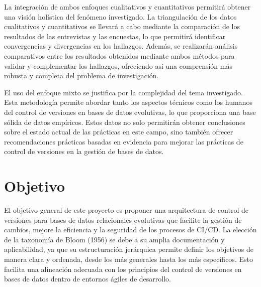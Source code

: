 \documentclass{IEEEtran}
\begin{document}
La integración de ambos enfoques cualitativos y cuantitativos permitirá obtener una visión holística del fenómeno investigado. La triangulación de los datos cualitativos y cuantitativos se llevará a cabo mediante la comparación de los resultados de las entrevistas y las encuestas, lo que permitirá identificar convergencias y divergencias en los hallazgos. Además, se realizarán análisis comparativos entre los resultados obtenidos mediante ambos métodos para validar y complementar los hallazgos, ofreciendo así una comprensión más robusta y completa del problema de investigación.

El uso del enfoque mixto se justifica por la complejidad del tema investigado. Esta metodología permite abordar tanto los aspectos técnicos como los humanos del control de versiones en bases de datos evolutivas, lo que proporciona una base sólida de datos empíricos. Estos datos no solo permitirán obtener conclusiones sobre el estado actual de las prácticas en este campo, sino también ofrecer recomendaciones prácticas basadas en evidencia para mejorar las prácticas de control de versiones en la gestión de bases de datos.


\section{Objetivo}
El objetivo general de este proyecto es proponer una arquitectura de control de versiones para bases de datos relacionales evolutivas que facilite la gestión de cambios, mejore la eficiencia y la seguridad de los procesos de CI/CD. La elección de la taxonomía de Bloom (1956) se debe a su amplia documentación y aplicabilidad, ya que su estructuración jerárquica permite definir los objetivos de manera clara y ordenada, desde los más generales hasta los más específicos. Esto facilita una alineación adecuada con los principios del control de versiones en bases de datos dentro de entornos ágiles de desarrollo.
\end{document}
